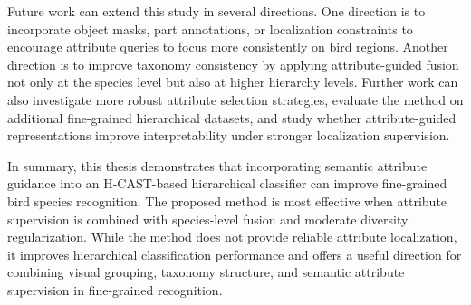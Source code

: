 Future work can extend this study in several directions. One direction is to incorporate object masks, part annotations, or localization constraints to encourage attribute queries to focus more consistently on bird regions. Another direction is to improve taxonomy consistency by applying attribute-guided fusion not only at the species level but also at higher hierarchy levels. Further work can also investigate more robust attribute selection strategies, evaluate the method on additional fine-grained hierarchical datasets, and study whether attribute-guided representations improve interpretability under stronger localization supervision.

In summary, this thesis demonstrates that incorporating semantic attribute guidance into an H-CAST-based hierarchical classifier can improve fine-grained bird species recognition. The proposed method is most effective when attribute supervision is combined with species-level fusion and moderate diversity regularization. While the method does not provide reliable attribute localization, it improves hierarchical classification performance and offers a useful direction for combining visual grouping, taxonomy structure, and semantic attribute supervision in fine-grained recognition.